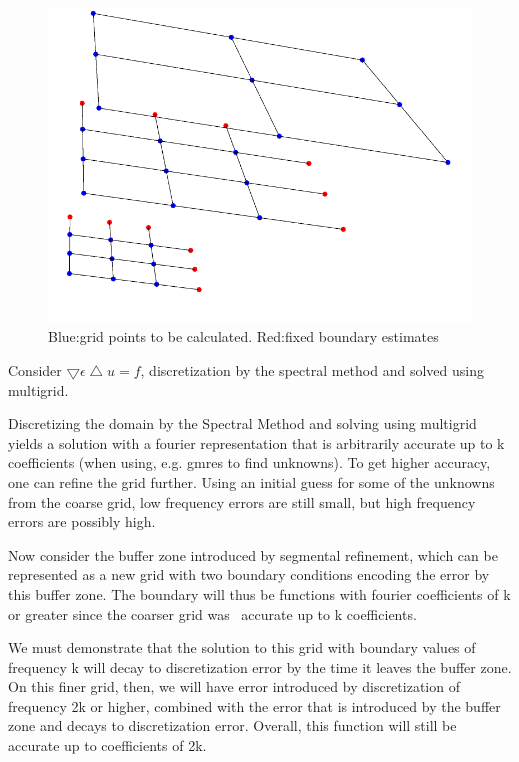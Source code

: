 \documentclass[12pt]{article}
\begin{document}
\begin{figure}
  \begin{center}
    \includegraphics[scale=0.4]{nsfpic.pdf}
  \end{center}
  \caption{\footnotesize{Blue:grid points to be calculated. Red:fixed boundary estimates}}
\end{figure}
    
    
    Consider $\bigtriangledown \epsilon \bigtriangleup u = f$, discretization by the spectral method and solved using multigrid.
    
    Discretizing the domain by the Spectral Method and solving using multigrid yields a solution with a fourier representation that is arbitrarily accurate up to k coefficients (when using, e.g. gmres to find unknowns). To get higher accuracy, one can refine the grid further. Using an initial guess for some of the unknowns from the coarse grid, low frequency errors are still small, but high frequency errors are possibly high. 
    
    Now consider the buffer zone introduced by segmental refinement, which can be represented as a new grid with two boundary conditions encoding the error by this buffer zone. The boundary will thus be functions with fourier coefficients of k or greater since the coarser grid was ~accurate up to k coefficients. 
    
    We must demonstrate that the solution to this grid with boundary values of frequency k will decay to discretization error by the time it leaves the buffer zone. On this finer grid, then, we will have error introduced by discretization of frequency 2k or higher, combined with the error that is introduced by the buffer zone and decays to discretization error. Overall, this function will still be accurate up to coefficients of 2k.
    
\end{document}
